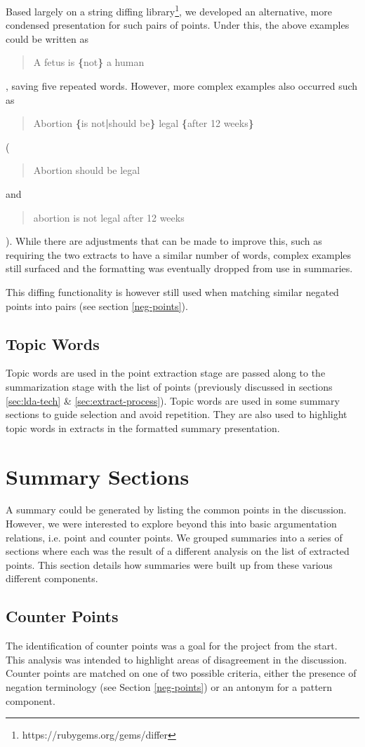       Based largely on a string diffing library\footnote{https://rubygems.org/gems/differ}, we developed an alternative, more condensed presentation for such pairs of points. Under this, the above examples could be written as \blockquote{A fetus is \textbf{\{}not\textbf{\}} a human}, saving five repeated words. However, more complex examples also occurred such as \blockquote{Abortion \textbf{\{}is not\textbf{|}should be\textbf{\}} legal \textbf{\{}after 12 weeks\textbf{\}}} (\blockquote{Abortion should be legal} and \blockquote{abortion is not legal after 12 weeks}). While there are adjustments that can be made to improve this, such as requiring the two extracts to have a similar number of words, complex examples still surfaced and the formatting was eventually dropped from use in summaries.

      This diffing functionality is however still used when matching similar negated points into pairs (see section \ref{neg-points}).

  \tocless\subsection{Topic Words}
  Topic words are used in the point extraction stage are passed along to the summarization stage with the list of points (previously discussed in sections \ref{sec:lda-tech} \& \ref{sec:extract-process}). Topic words are used in some summary sections to guide selection and avoid repetition. They are also used to highlight topic words in extracts in the formatted summary presentation.

  \section{Summary Sections}
    A summary could be generated by listing the common points in the discussion. However, we were interested to explore beyond this into basic argumentation relations, i.e. point and counter points. We grouped summaries into a series of sections where each was the result of a different analysis on the list of extracted points. This section details how summaries were built up from these various different components.

    \subsection{Counter Points}
      The identification of counter points was a goal for the project from the start. This analysis was intended to highlight areas of disagreement in the discussion. Counter points are matched on one of two possible criteria, either the presence of negation terminology (see Section \ref{neg-points}) or an antonym for a pattern component.


